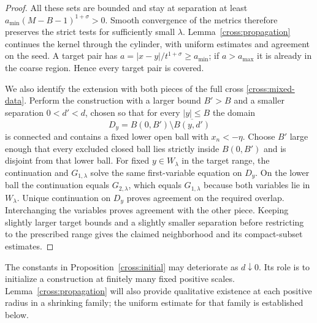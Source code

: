 \begin{proof}
All these sets are bounded and stay at separation at least
$a_{\min}(M-B-1)^{1+\sigma}>0$.  Smooth convergence of the metrics
therefore preserves the strict tests for sufficiently small $\lambda$.
Lemma~\ref{cross:propagation} continues the kernel through the cylinder,
with uniform estimates and agreement on the seed.  A target pair has
$a=|x-y|/t^{1+\sigma}\ge a_{\min}$; if $a>a_{\max}$ it is already in
the coarse region.  Hence every target pair is covered.

We also identify the extension with both pieces of the full cross
\eqref{cross:mixed-data}. Perform the construction with a larger bound
$B'>B$ and a smaller separation $0<d'<d$, chosen so that for every
$|y|\le B$ the domain
\[
 D_y=B(0,B')\setminus\overline{B(y,d')}
\]
is connected and contains a fixed lower open ball with $x_n<-\eta$.
Choose $B'$ large enough that every excluded closed ball lies strictly
inside $B(0,B')$ and is disjoint from that lower ball.
For fixed $y\in W_\lambda$ in the target range, the continuation
and $G_{1,\lambda}$ solve the same first-variable equation on $D_y$.
On the lower ball the continuation equals $G_{2,\lambda}$, which equals
$G_{1,\lambda}$ because both variables lie in $W_\lambda$.
Unique continuation on $D_y$ proves agreement on the required overlap.
Interchanging the variables proves agreement with the other piece.
Keeping slightly larger target bounds and a slightly smaller separation
before restricting to the prescribed range gives the claimed neighborhood
and its compact-subset estimates.
\end{proof}

The constants in Proposition~\ref{cross:initial} may deteriorate as
$d\downarrow0$.  Its role is to initialize a construction at finitely
many fixed positive scales.  Lemma~\ref{cross:propagation} will also
provide qualitative existence at each positive radius in a shrinking
family; the uniform estimate for that family is established below.
